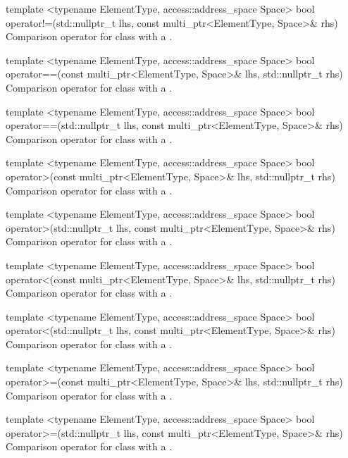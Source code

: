 \addRowTwoL
{template <typename ElementType, access::address_space Space>}
{bool operator!=(std::nullptr_t lhs, const multi_ptr<ElementType, Space>\& rhs)}
{Comparison operator \codeinline{!=} for  class with a
.}

\addRowTwoL
{template <typename ElementType, access::address_space Space>}
{bool operator==(const multi_ptr<ElementType, Space>\& lhs, std::nullptr_t rhs)}
{Comparison operator \codeinline{==} for  class with a
.}

\addRowTwoL
{template <typename ElementType, access::address_space Space>}
{bool operator==(std::nullptr_t lhs, const multi_ptr<ElementType, Space>\& rhs)}
{Comparison operator \codeinline{==} for  class with a
.}

\addRowTwoL
{template <typename ElementType, access::address_space Space>}
{bool operator>(const multi_ptr<ElementType, Space>\& lhs, std::nullptr_t rhs)}
{Comparison operator \codeinline{>} for  class with a
.}

\addRowTwoL
{template <typename ElementType, access::address_space Space>}
{bool operator>(std::nullptr_t lhs, const multi_ptr<ElementType, Space>\& rhs)}
{Comparison operator \codeinline{>} for  class with a
.}

\addRowTwoL
{template <typename ElementType, access::address_space Space>}
{bool operator<(const multi_ptr<ElementType, Space>\& lhs, std::nullptr_t rhs)}
{Comparison operator \codeinline{<} for  class with a
.}

\addRowTwoL
{template <typename ElementType, access::address_space Space>}
{bool operator<(std::nullptr_t lhs, const multi_ptr<ElementType, Space>\& rhs)}
{Comparison operator \codeinline{<} for  class with a
.}

\addRowTwoL
{template <typename ElementType, access::address_space Space>}
{bool operator>=(const multi_ptr<ElementType, Space>\& lhs, std::nullptr_t rhs)}
{Comparison operator \codeinline{>=} for  class with a
.}

\addRowTwoL
{template <typename ElementType, access::address_space Space>}
{bool operator>=(std::nullptr_t lhs, const multi_ptr<ElementType, Space>\& rhs)}
{Comparison operator \codeinline{>=} for  class with a
.}

